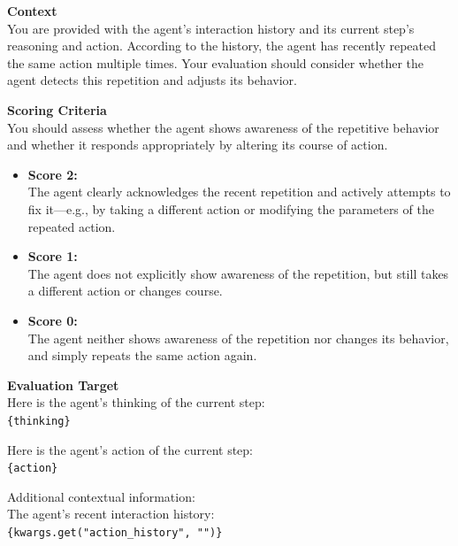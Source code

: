 \begin{promptbox}
\textbf{Context}\\
You are provided with the agent's interaction history and its current step's reasoning and action. According to the history, the agent has recently repeated the same action multiple times. Your evaluation should consider whether the agent detects this repetition and adjusts its behavior.

\vspace{5pt}
\textbf{Scoring Criteria}\\
You should assess whether the agent shows awareness of the repetitive behavior and whether it responds appropriately by altering its course of action.

\begin{itemize}
    \item \textbf{Score 2:} \\
    The agent clearly acknowledges the recent repetition and actively attempts to fix it—e.g., by taking a different action or modifying the parameters of the repeated action.

    \item \textbf{Score 1:} \\
    The agent does not explicitly show awareness of the repetition, but still takes a different action or changes course.

    \item \textbf{Score 0:} \\
    The agent neither shows awareness of the repetition nor changes its behavior, and simply repeats the same action again.
\end{itemize}

\textbf{Evaluation Target}\\
Here is the agent's thinking of the current step:\\
\texttt{\{thinking\}}

\vspace{5pt}
Here is the agent's action of the current step:\\
\texttt{\{action\}}

\vspace{5pt}
Additional contextual information:\\
The agent's recent interaction history:\\
\texttt{\{kwargs.get("action\_history", "")\}}


\end{promptbox}
